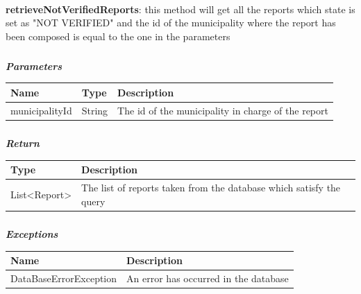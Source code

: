 						\paragraph{}
							\textbf{retrieveNotVerifiedReports}: this method will get all the reports which state is set as "NOT VERIFIED" and the id of the municipality where the report has been composed is equal to the one in the parameters
							\subparagraph{}
							\textit{\textbf{Parameters}}
								\begin{table}[!h]
									\begin{tabular}{L{0.2\textwidth}L{0.2\textwidth}L{0.2\textwidth}}
										\toprule
										Name & Type & Description \\
										\midrule
								  		municipalityId & String & The id of the municipality in charge of the report \\
								 		\bottomrule
									\end{tabular}
								\end{table}
							\subparagraph{}
								\textit{\textbf{Return}}
									\begin{table}[!h]
									\begin{tabular}{L{0.3\textwidth}L{0.3\textwidth}}
										\toprule
										Type & Description \\
										\midrule
								  	List<Report> & The list of reports taken from the database which satisfy the query \\
								 		\bottomrule
									\end{tabular}
								\end{table}
							\subparagraph{}
								\textit{\textbf{Exceptions}}
									\begin{table}[!h]
									\begin{tabular}{L{0.3\textwidth}L{0.3\textwidth}}
										\toprule
										Name & Description \\
										\midrule
								  		DataBaseErrorException & An error has occurred in the database \\
								 		\bottomrule
									\end{tabular}
								\end{table}
								
